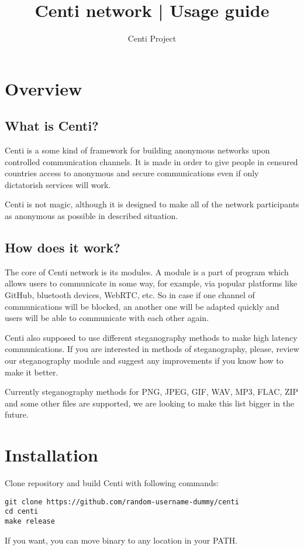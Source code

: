 \documentclass{article}
\title{Centi network | Usage guide}
\author{Centi Project}
\begin{document}
\maketitle
\newpage
\tableofcontents
\newpage
\section{Overview}
	\subsection{What is Centi?}
	Centi is a some kind of framework for building anonymous
	networks upon controlled communication channels.
	It is made in order to give people in censured countries access
	to anonymous and secure communications even if only dictatorish services will work.

	Centi is not magic, although it is designed to make all of
	the network participants as anonymous as possible in described situation.

	\subsection{How does it work?}
	The core of Centi network is its modules. A module is a part of
	program which allows users to communicate in some way, for example,
	via popular platforms like GitHub, bluetooth devices, WebRTC, etc.
	So in case if one channel of communications will be blocked, an another
	one will be adapted quickly and users will be able to communicate with each other again.
	
	Centi also supposed to use different steganography methods to make
	high latency communications. If you are interested in methods of steganography,
	please, review our steganography module and suggest any improvements if you know
	how to make it better.

	Currently steganography methods for PNG, JPEG, GIF, WAV, MP3, FLAC, ZIP and some
	other files are supported, we are looking to make this list bigger in the future.

\section{Installation}
	Clone repository and build Centi with following commands:
	\begin{lstlisting}
git clone https://github.com/random-username-dummy/centi
cd centi
make release
	\end{lstlisting}
	If you want, you can move binary to any location in your PATH.
\end{document}
